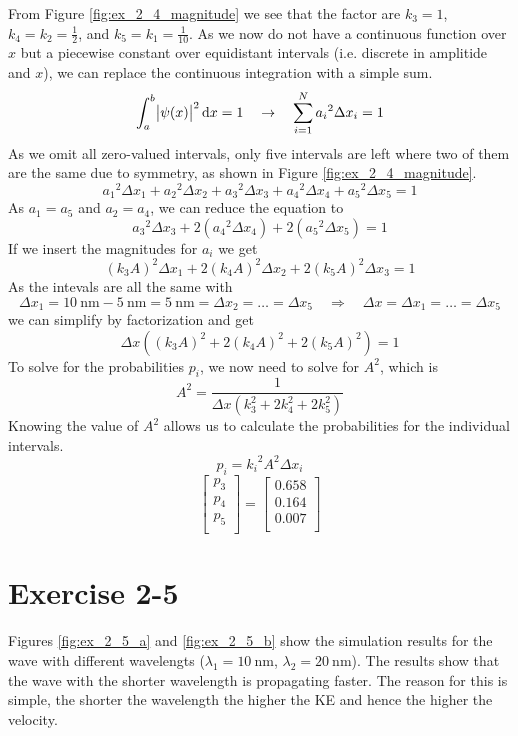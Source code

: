 From Figure \ref{fig:ex_2_4_magnitude} we see that the factor are
$k_3 = 1$, $k_4=k_2=\frac{1}{2}$, and $k_5=k_1=\frac{1}{10}$.
As we now do not have a continuous function over $x$ but a piecewise
constant over equidistant intervals (i.e. discrete in amplitide and $x$),
we can replace the continuous integration with a simple sum.
\[
	\int_a^b \abs{\psi(x)}^2 \dif x = 1
	\quad \rightarrow \quad
	\sum_{i=1}^{N} {a_i}^2 \Delta x_i = 1
\]
As we omit all zero-valued intervals, only five intervals are left where two
of them are the same due to symmetry, as shown in Figure
\ref{fig:ex_2_4_magnitude}.
\[
	{a_1}^2 \Delta x_1 + {a_2}^2 \Delta x_2 + {a_3}^2 \Delta x_3 + {a_4}^2 \Delta x_4 + {a_5}^2 \Delta x_5 = 1
\]
As $a_1 = a_5$ and $a_2 = a_4$, we can reduce the equation to
\[
	{a_3}^2 \Delta x_3 + 2 \left({a_4}^2 \Delta x_4\right) + 2 \left({a_5}^2 \Delta x_5\right) = 1
\]
If we insert the magnitudes for $a_i$ we get
\[
	\left(k_3A\right)^2 \Delta x_1 + 2 \left(k_4A\right)^2 \Delta x_2 + 2 \left(k_5A\right)^2 \Delta x_3 = 1
\]
As the intevals are all the same with
\[
	\Delta x_1
	= \SI{10}{\nano\m} - \SI{5}{\nano\m}
	= \SI{5}{\nano\m}
	= \Delta x_2 = \dots = \Delta x_5
	\quad \Rightarrow \quad 
	\Delta x = \Delta x_1 = \dots = \Delta x_5
\]
we can simplify by factorization and get
\[
	\Delta x \left( \left(k_3A\right)^2 + 2 \left(k_4A\right)^2 + 2 \left(k_5A\right)^2 \right) = 1
\]
To solve for the probabilities $p_i$, we now need to solve for $A^2$, which is
\[
	A^2 = \frac{1}{\Delta x \left(k_3^2 + 2 k_4^2 + 2 k_5^2\right)}
\]
Knowing the value of $A^2$ allows us to calculate the probabilities for the
individual intervals.
\[
	p_i = {k_i}^2 A^2 \Delta x_i
\]
\[
	\begin{bmatrix}
		p_3 \\
		p_4 \\
		p_5 \\
	\end{bmatrix}
	=
	\begin{bmatrix}
		0.658 \\
		0.164 \\
		0.007 \\
	\end{bmatrix}	
\]




\newpage
\section{Exercise 2-5}

Figures \ref{fig:ex_2_5_a} and \ref{fig:ex_2_5_b} show the simulation results
for the wave with different wavelengts ($\lambda_1 = \SI{10}{\nano\m}$,
$\lambda_2 = \SI{20}{\nano\m}$). The results show that the wave with the
shorter wavelength is propagating faster. The reason for this is simple, the
shorter the wavelength the higher the KE and hence the higher the velocity.

